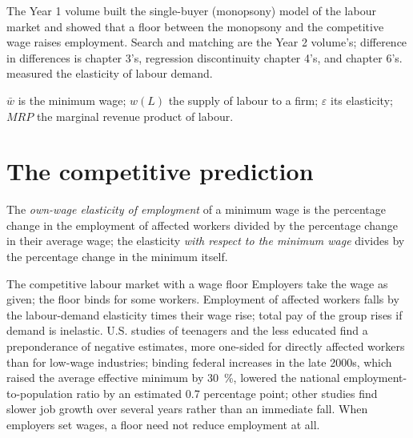 \begin{recall}
The Year 1 volume built the single-buyer (monopsony) model of the labour market and
showed that a floor between the monopsony and the competitive wage raises
employment. Search and matching are the Year 2 volume's; difference in differences
is chapter 3's, regression discontinuity chapter 4's, and  chapter 6's.
 measured the elasticity of labour demand.
\end{recall}

\begin{notation}\label{not:b3:minimum-wage:symbols}
$\bar w$ is the minimum wage; $w(L)$ the supply of labour to a firm; $\varepsilon$ its elasticity;
$\mathit{MRP}$ the marginal revenue product of labour.
\end{notation}

\section{The competitive prediction}\label{sec:b3:minimum-wage:competitive}

\begin{definition}\label{def:b3:minimum-wage:own-wage}
The \emph{own-wage elasticity of employment} of a minimum wage is the percentage
change in the employment of affected workers divided by the percentage change in
their average wage; the elasticity \emph{with respect to the minimum wage} divides
by the percentage change in the minimum itself.
\end{definition}

\begin{model}{The competitive labour market with a wage floor}
\assumes Employers take the wage as given; the floor binds for some workers.
\predicts Employment of affected workers falls by the labour-demand elasticity
times their wage rise; total pay of the group rises if demand is inelastic.
\tested U.S. studies of teenagers and the less educated find a preponderance of
negative estimates, more one-sided for directly affected workers than for low-wage
industries; %
binding federal increases in the late 2000s, which raised the average effective
minimum by 30~\%, lowered the national employment-to-population ratio by an estimated
0.7 percentage point; %
other studies find slower job growth over several years rather than an immediate
fall. %
\breaks When employers set wages, a floor need not reduce employment at all.
\end{model}


